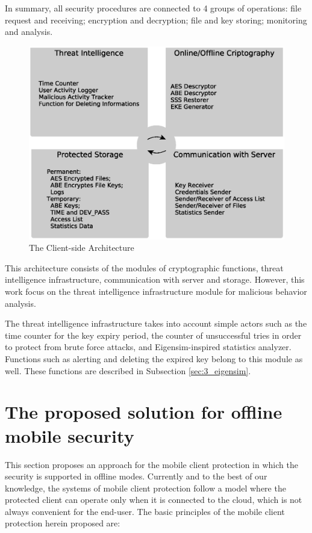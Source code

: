 In summary, all security procedures are connected to 4 groups of operations: file request and receiving; encryption and decryption; file and key storing; monitoring and analysis.

\begin{figure}[h!]
	\centering
	\includegraphics[width=12cm]{figs/ch3/fig02.eps}
	\caption{The Client-side Architecture}
	\label{fig:3_02}
\end{figure}

This architecture consists of the modules of cryptographic functions, threat intelligence infrastructure, communication with server and storage. However, this work focus on the threat intelligence infrastructure module for malicious behavior analysis.

The threat intelligence infrastructure takes into account simple actors such as the time counter for the key expiry period, the counter of unsuccessful tries in order to protect from brute force attacks, and Eigensim-inspired statistics analyzer. Functions such as alerting and deleting the expired key belong to this module as well. These functions are described in Subsection \ref{sec:3_eigensim}.

\section{The proposed solution for offline mobile security}
\label{sec:3_offline_mode}

This section proposes an approach for the mobile client protection in which the security is supported in offline modes. Currently and to the best of our knowledge, the systems of mobile client protection follow a model where the protected client can operate only when it is connected to the cloud, which is not always convenient for the end-user. The basic principles of the mobile client protection herein proposed are: 

